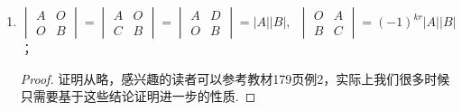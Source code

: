 \begin{enumerate}
    \item $\begin{vmatrix}
                  A & O \\ O & B
              \end{vmatrix} = \begin{vmatrix}
                  A & O \\ C & B
              \end{vmatrix} = \begin{vmatrix}
                  A & D \\ O & B
              \end{vmatrix} = |A||B|,\enspace\begin{vmatrix}
                  O & A \\ B & C
              \end{vmatrix} = (-1)^{kr}|A||B|$；
    \begin{proof}
        证明从略，感兴趣的读者可以参考教材179页例2，实际上我们很多时候只需要基于这些结论证明进一步的性质.
    \end{proof}


\end{enumerate}
